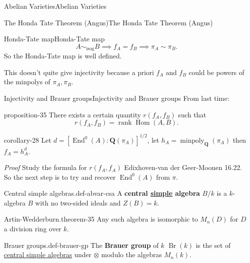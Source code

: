 \documentclass[10pt,]{book}
\makeatletter
\newcommand{\terminology}[1]{\textbf{#1}}
\renewcommand*{\proofname}{Proof}
\renewenvironment{proof}[1][\proofname]{\par
  \pushQED{\qed}%
  \normalfont \topsep6\p@\@plus6\p@\relax
  \trivlist
  \item\relax
    {\itshape
    #1\@addpunct{.}}\hspace\labelsep\ignorespaces
}{%
  \popQED\endtrivlist\@endpefalse
}
\numberwithin{equation}{section}
\newcommand{\lb}{[}
\newcommand{\rb}{]}
\newcommand{\QQ}{\mathbf{Q}}
\DeclareMathOperator{\End}{End}
\DeclareMathOperator{\Hom}{Hom}
\DeclareMathOperator{\rank}{rank}
\makeatother
\begin{document}
\begin{chapterptx}{Abelian Varieties}{}{Abelian Varieties}{}{}
\begin{sectionptx}{The Honda Tate Theorem (Angus)}{}{The Honda Tate Theorem (Angus)}{}{}
\begin{subsectionptx}{Honda-Tate map}{}{Honda-Tate map}{}{}
\begin{equation*}
A \sim_{\text{isog}} B\implies  f_A =f_B \implies \pi_A \sim \pi_B\text{.}
\end{equation*}
So the Honda-Tate map is well defined.%
\par
\hypertarget{p-415}{}%
This doesn't quite give injectivity because a priori \(f_A\) and \(f_B\) could be powers of the minpolys of \(\pi_A, \pi_B\).%
\end{subsectionptx}
%
%
\typeout{************************************************}
\typeout{************************************************}
%
\begin{subsectionptx}{Injectivity and Brauer groups}{}{Injectivity and Brauer groups}{}{}\label{subsection-37}
\hypertarget{p-416}{}%
From last time:%
\begin{proposition}{}{}{proposition-35}%
\hypertarget{p-417}{}%
There exists a certain quantity \(r(f_A, f_B)\) such that%
\begin{equation*}
r(f_A, f_B) = \rank \Hom(A,B)\text{.}
\end{equation*}
%
\end{proposition}
\begin{corollary}{}{}{corollary-28}%
\hypertarget{p-418}{}%
Let \(d = \lb \End^0(A) : \QQ(\pi_A) \rb^{1/2}\), let \(h_A = \operatorname{minpoly}_\QQ(\pi_A)\) then \(f_A = h_A^d\).%
\end{corollary}
\begin{proof}\hypertarget{proof-71}{}
\hypertarget{p-419}{}%
Study the formula for \(r(f_A, f_A)\) Edixhoven-van der Geer-Moonen 16.22.%
\end{proof}
\hypertarget{p-420}{}%
So the next step is to try and recover \(\End^0(A)\) from \(\pi\).%
\begin{definition}{Central simple algebras.}{def-abvar-csa}%
\hypertarget{p-421}{}%
A \terminology{central \hyperref[def-simple-av]{simple} algebra} \(B/k\) is a \(k\)-algebra \(B\) with no two-sided ideals and \(Z(B) = k\).%
\end{definition}
\begin{theorem}{Artin-Wedderburn.}{}{theorem-35}%
\hypertarget{p-422}{}%
Any such algebra is isomorphic to \(M_n(D)\) for \(D\) a division ring over \(k\).%
\end{theorem}
\begin{definition}{Brauer groups.}{def-brauer-gp}%
\hypertarget{p-423}{}%
The \terminology{Brauer group} of \(k\) \(\operatorname{Br}(k)\) is the set of \hyperref[def-abvar-csa]{central \hyperref[def-simple-av]{simple} algebras} under \(\otimes\) modulo the algebras \(M_n(k)\).%

\end{definition}
\end{subsectionptx}
\end{sectionptx}
\end{chapterptx}
\end{document}
